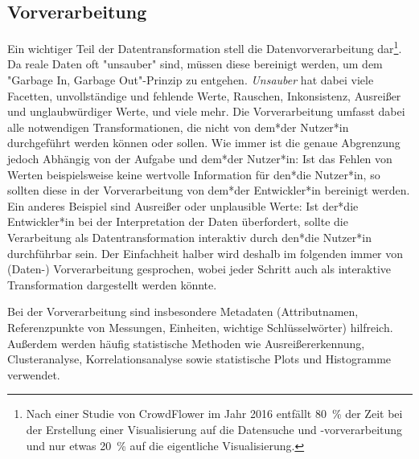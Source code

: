 		\subsection{Vorverarbeitung}
			Ein wichtiger Teil der Datentransformation stell die Datenvorverarbeitung dar\footnote{Nach einer Studie von CrowdFlower im Jahr 2016 entfällt \SI{80}{\percent} der Zeit bei der Erstellung einer Visualisierung auf die Datensuche und -vorverarbeitung und nur etwas \SI{20}{\percent} auf die eigentliche Visualisierung.}. Da reale Daten oft "unsauber" sind, müssen diese bereinigt werden, um dem "Garbage In, Garbage Out"-Prinzip zu entgehen. \emph{Unsauber} hat dabei viele Facetten, \zB unvollständige und fehlende Werte, Rauschen, Inkonsistenz, Ausreißer und unglaubwürdiger Werte, und viele mehr. Die Vorverarbeitung umfasst dabei alle notwendigen Transformationen, die nicht von dem*der Nutzer*in durchgeführt werden können oder sollen. Wie immer ist die genaue Abgrenzung jedoch Abhängig von der Aufgabe und dem*der Nutzer*in: Ist das Fehlen von Werten beispielsweise keine wertvolle Information für den*die Nutzer*in, so sollten diese in der Vorverarbeitung von dem*der Entwickler*in bereinigt werden. Ein anderes Beispiel sind Ausreißer oder unplausible Werte: Ist der*die Entwickler*in bei der Interpretation der Daten überfordert, sollte die Verarbeitung als Datentransformation interaktiv durch den*die Nutzer*in durchführbar sein. Der Einfachheit halber wird deshalb im folgenden immer von (Daten-) Vorverarbeitung gesprochen, wobei jeder Schritt auch als interaktive Transformation dargestellt werden könnte.

			Bei der Vorverarbeitung sind insbesondere Metadaten (\zB Attributnamen, Referenzpunkte von Messungen, Einheiten, wichtige Schlüsselwörter) hilfreich. Außerdem werden häufig statistische Methoden wie Ausreißererkennung, Clusteranalyse, Korrelationsanalyse sowie statistische Plots und Histogramme verwendet.

